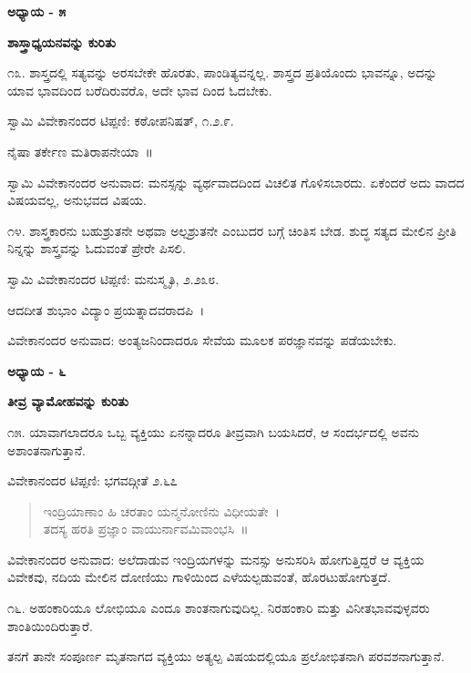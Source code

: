 \begin{center}
\textbf{ಅಧ್ಯಾಯ - ೫}
\end{center}

\begin{center}
\textbf{ಶಾಸ್ತ್ರಾಧ್ಯಯನವನ್ನು ಕುರಿತು}
\end{center}

೧೩. ಶಾಸ್ತ್ರದಲ್ಲಿ ಸತ್ಯವನ್ನು ಅರಸಬೇಕೇ ಹೊರತು, ಪಾಂಡಿತ್ಯವನ್ನಲ್ಲ. ಶಾಸ್ತ್ರದ ಪ್ರತಿಯೊಂದು ಭಾವನ್ನೂ, ಅದನ್ನು ಯಾವ ಭಾವದಿಂದ ಬರೆದಿರುವರೊ, ಅದೇ ಭಾವ ದಿಂದ ಓದಬೇಕು. 

ಸ್ವಾಮಿ ವಿವೇಕಾನಂದರ ಟಿಪ್ಪಣಿ: ಕಠೋಪನಿಷತ್, ೧.೨.೯.

ನೈಷಾ ತರ್ಕೇಣ ಮತಿರಾಪನೇಯಾ~॥

ಸ್ವಾಮಿ ವಿವೇಕಾನಂದರ ಅನುವಾದ: ಮನಸ್ಸನ್ನು ವ್ಯರ್ಥವಾದದಿಂದ ವಿಚಲಿತ ಗೊಳಿಸಬಾರದು. ಏಕೆಂದರೆ ಅದು ವಾದದ ವಿಷಯವಲ್ಲ, ಅನುಭವದ ವಿಷಯ.

೧೪. ಶಾಸ್ತ್ರಕಾರನು ಬಹುಶ್ರುತನೇ ಅಥವಾ ಅಲ್ಪಶ್ರುತನೇ ಎಂಬುದರ ಬಗ್ಗೆ ಚಿಂತಿಸ ಬೇಡ. ಶುದ್ಧ ಸತ್ಯದ ಮೇಲಿನ ಪ್ರೀತಿ ನಿನ್ನನ್ನು ಶಾಸ್ತ್ರವನ್ನು ಓದುವಂತೆ ಪ್ರೇರೇ ಪಿಸಲಿ. 

ಸ್ವಾಮಿ ವಿವೇಕಾನಂದರ ಟಿಪ್ಪಣಿ: ಮನುಸ್ಮೃತಿ, ೨.೨೩೮.

ಆದದೀತ ಶುಭಾಂ ವಿದ್ಯಾಂ ಪ್ರಯತ್ನಾದವರಾದಪಿ~।

ವಿವೇಕಾನಂದರ ಅನುವಾದ: ಅಂತ್ಯಜನಿಂದಾದರೂ ಸೇವೆಯ ಮೂಲಕ ಪರಜ್ಞಾನವನ್ನು ಪಡೆಯಬೇಕು.

\begin{center}
\textbf{ಅಧ್ಯಾಯ - ೬}
\end{center}

\begin{center}
\textbf{ತೀವ್ರ ವ್ಯಾಮೋಹವನ್ನು ಕುರಿತು}
\end{center}

೧೫. ಯಾವಾಗಲಾದರೂ ಒಬ್ಬ ವ್ಯಕ್ತಿಯು ಏನನ್ನಾದರೂ ತೀವ್ರವಾಗಿ ಬಯಸಿದರೆ, ಆ ಸಂದರ್ಭದಲ್ಲಿ ಅವನು ಅಶಾಂತನಾಗುತ್ತಾನೆ. 

ವಿವೇಕಾನಂದರ ಟಿಪ್ಪಣಿ: ಭಗವದ್ಗೀತೆ ೨.೬೭

\begin{verse}
ಇಂದ್ರಿಯಾಣಾಂ ಹಿ ಚರತಾಂ ಯನ್ಮನೋಣಿನು ವಿಧೀಯತೇ~।\\ತದಸ್ಯ ಹರತಿ ಪ್ರಜ್ಞಾಂ ವಾಯುರ್ನಾವಮಿವಾಂಭಸಿ~॥
\end{verse}

ವಿವೇಕಾನಂದರ ಅನುವಾದ: ಅಲೆದಾಡುವ ಇಂದ್ರಿಯಗಳನ್ನು ಮನಸ್ಸು ಅನುಸರಿಸಿ ಹೋಗುತ್ತಿದ್ದರೆ ಆ ವ್ಯಕ್ತಿಯ ವಿವೇಕವು, ನದಿಯ ಮೇಲಿನ ದೋಣಿಯು ಗಾಳಿಯಿಂದ ಎಳೆಯಲ್ಪಡುವಂತೆ, ಹೊರಟುಹೋಗುತ್ತದೆ.

೧೬. ಅಹಂಕಾರಿಯೂ ಲೋಭಿಯೂ ಎಂದೂ ಶಾಂತನಾಗುವುದಿಲ್ಲ. ನಿರಹಂಕಾರಿ ಮತ್ತು ವಿನೀತಭಾವವುಳ್ಳವರು ಶಾಂತಿಯಿಂದಿರುತ್ತಾರೆ.

ತನಗೆ ತಾನೇ ಸಂಪೂರ್ಣ ಮೃತನಾಗದ ವ್ಯಕ್ತಿಯು ಅತ್ಯಲ್ಪ ವಿಷಯದಲ್ಲಿಯೂ ಪ್ರಲೋಭಿತನಾಗಿ ಪರವಶನಾಗುತ್ತಾನೆ. 

